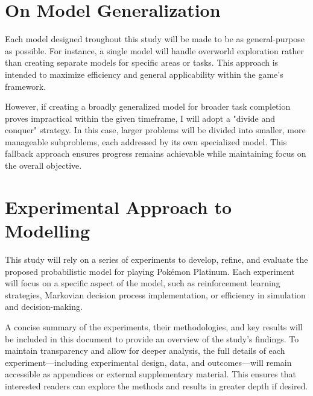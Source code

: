 \section{On Model Generalization}

Each model designed troughout this study will be made to be as general-purpose as possible. For instance, a single model will handle overworld exploration rather than creating separate models for specific areas or tasks. This approach is intended to maximize efficiency and general applicability within the game's framework. 

However, if creating a broadly generalized model for broader task completion proves impractical within the given timeframe, I will adopt a "divide and conquer" strategy. In this case, larger problems will be divided into smaller, more manageable subproblems, each addressed by its own specialized model. This fallback approach ensures progress remains achievable while maintaining focus on the overall objective.

\section{Experimental Approach to Modelling}

This study will rely on a series of experiments to develop, refine, and evaluate the proposed probabilistic model for playing Pokémon Platinum. Each experiment will focus on a specific aspect of the model, such as reinforcement learning strategies, Markovian decision process implementation, or efficiency in simulation and decision-making.

A concise summary of the experiments, their methodologies, and key results will be included in this document to provide an overview of the study's findings. To maintain transparency and allow for deeper analysis, the full details of each experiment—including experimental design, data, and outcomes—will remain accessible as appendices or external supplementary material. This ensures that interested readers can explore the methods and results in greater depth if desired.